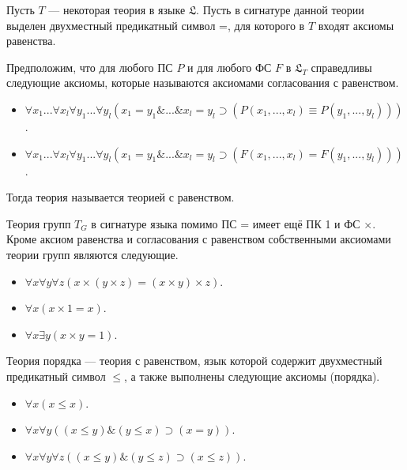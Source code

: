 
    \begin{Def}
        Пусть $T$ --- некоторая теория в языке $\mathfrak{L}$. Пусть в сигнатуре данной теории выделен двухместный предикатный символ =, для которого в $T$ входят аксиомы равенства. 
        
        Предположим, что для любого ПС $P$ и для любого ФС $F$ в $\mathfrak{L}_T$ справедливы следующие аксиомы, которые называются аксиомами согласования с равенством.
        \begin{itemize}
            \item $\forall x_1 ... \forall x_l \forall y_1 ... \forall y_l (x_1 = y_1 \& ... \& x_l = y_l \supset (P(x_1, ..., x_l) \equiv P(y_1, ..., y_l)))$.
            \item $\forall x_1 ... \forall x_l \forall y_1 ... \forall y_l (x_1 = y_1 \& ... \& x_l = y_l \supset (F(x_1, ..., x_l) = F(y_1, ..., y_l)))$.
        \end{itemize}
        Тогда теория называется теорией с равенством.
    \end{Def}


    \begin{Def}
        Теория групп $T_G$ в сигнатуре языка помимо ПС = имеет ещё ПК 1 и ФС $\times$. Кроме аксиом равенства и согласования с равенством собственными аксиомами теории групп являются следующие.
        \begin{itemize}
            \item $\forall x \forall y \forall z (x \times (y \times z) = (x \times y) \times z)$.
            \item $\forall x (x \times 1 = x)$.
            \item $\forall x \exists y (x \times y = 1)$.
        \end{itemize}
    \end{Def}


    \begin{Def}
        Теория порядка --- теория с равенством, язык которой содержит двухместный предикатный символ $\leq$, а также выполнены следующие аксиомы (порядка).
        \begin{itemize}
            \item $\forall x (x \leq x)$.
            \item $\forall x \forall y ((x \leq y) \& (y \leq x) \supset (x = y))$.
            \item $\forall x \forall y \forall z ((x \leq y) \& (y \leq z) \supset (x \leq z))$.
        \end{itemize}
    \end{Def}

